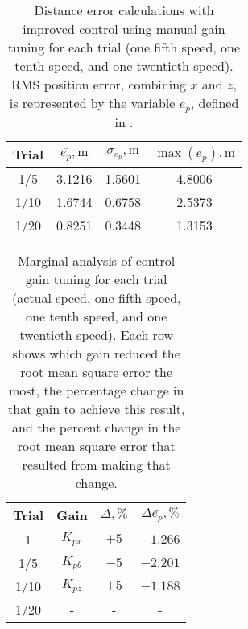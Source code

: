 \begin{table}[hb]
\caption{Distance error calculations with improved control using manual gain tuning for each trial (one fifth speed, one tenth speed, and one twentieth speed). RMS position error, combining $x$ and $z$, is represented by the variable $e_p$, defined in .}
\label{tab:icRMSE}
\begin{center}
\begin{tabular}{cccc}
\toprule
Trial & $\overline{e_p}, \si{\meter}$ & $\sigma_{e_p}, \si{\meter}$ & $\max(e_p), \si{\meter}$  \\ \midrule
1/5 & 3.1216 & 1.5601 & 4.8006 \\
1/10 & 1.6744 & 0.6758 & 2.5373 \\
1/20 & 0.8251 & 0.3448 & 1.3153 \\
\bottomrule
\end{tabular}
\end{center}
\end{table}

\begin{table}[hb]
\caption{Marginal analysis of control gain tuning for each trial (actual speed, one fifth speed, one tenth speed, and one twentieth speed). Each row shows which gain reduced the root mean square error the most, the percentage change in that gain to achieve this result, and the percent change in the root mean square error that resulted from making that change.}
\label{tab:marginalanalysis}
\begin{center}
\begin{tabular}{cccc}
\toprule
Trial & Gain & $\Delta , \%$ & $\Delta \bar{e_p}, \%$  \\ %
\midrule
1 & $K_{px}$ & $+5$ & $-1.266$ \\
1/5 & $K_{p\theta}$ & $-5$ & $-2.201$ \\
1/10 & $K_{pz}$ & $+5$ & $-1.188$ \\
1/20 & - & - & - \\
\bottomrule
\end{tabular}
\end{center}
\end{table}


